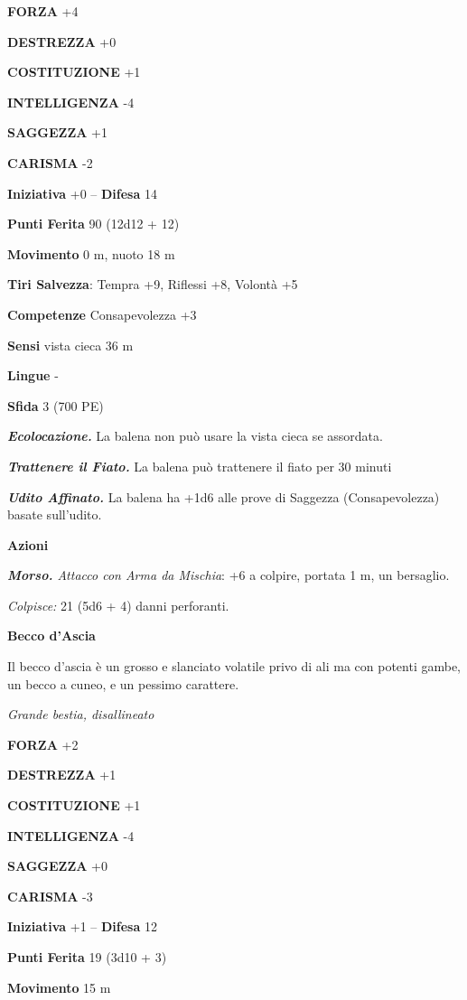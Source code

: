 \begin{multicols}{2}
\textbf{FORZA} +4

\textbf{DESTREZZA} +0

\textbf{COSTITUZIONE} +1

\textbf{INTELLIGENZA} -4

\textbf{SAGGEZZA} +1

\textbf{CARISMA} -2

\textbf{Iniziativa} +0 -- \textbf{Difesa} 14

\textbf{Punti Ferita} 90 (12d12 + 12)

\textbf{Movimento} 0 m, nuoto 18 m

\textbf{Tiri Salvezza}: Tempra +9, Riflessi +8, Volontà +5

\textbf{Competenze} Consapevolezza +3

\textbf{Sensi} vista cieca 36 m

\textbf{Lingue} -

\textbf{Sfida} 3 (700 PE)

\emph{\textbf{Ecolocazione.}} La balena non può usare la vista cieca se assordata.

\emph{\textbf{Trattenere il Fiato.}} La balena può trattenere il fiato per 30 minuti

\emph{\textbf{Udito Affinato.}} La balena ha +1d6 alle prove di Saggezza (Consapevolezza) basate sull'udito.

\textbf{Azioni}

\emph{\textbf{Morso.} Attacco con Arma da Mischia}: +6 a colpire, portata 1 m, un bersaglio.

\emph{Colpisce:} 21 (5d6 + 4) danni perforanti.

\medskip\textbf{Becco d'Ascia}

Il becco d'ascia è un grosso e slanciato volatile privo di ali ma con potenti gambe, un becco a cuneo, e un pessimo carattere.

\emph{Grande bestia, disallineato}

\textbf{FORZA} +2

\textbf{DESTREZZA} +1

\textbf{COSTITUZIONE} +1

\textbf{INTELLIGENZA} -4

\textbf{SAGGEZZA} +0

\textbf{CARISMA} -3

\textbf{Iniziativa} +1 -- \textbf{Difesa} 12

\textbf{Punti Ferita} 19 (3d10 + 3)

\textbf{Movimento} 15 m


\end{multicols}
